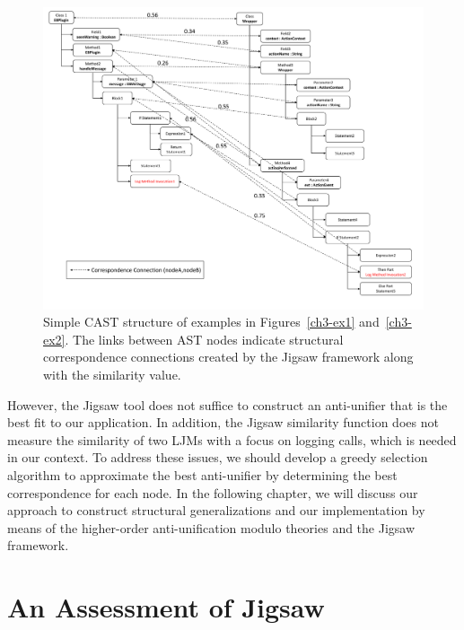 \begin{figure} [H]
  \centering\includegraphics [width = \textwidth]{Drawing4/FirstCorr.pdf}
  \caption{Simple CAST structure of examples in Figures~\ref{ch3-ex1} and~\ref{ch3-ex2}. The links between AST nodes indicate structural correspondence connections created by the Jigsaw framework along with the similarity value.}
  \label{fig:meth-ast-1}
\end{figure}

However, the Jigsaw tool does not suffice to construct an anti-unifier that is the best fit to our application. In addition, the Jigsaw similarity function does not measure the similarity of two LJMs with a focus on logging calls, which is needed in our context. To address these issues, we should develop a greedy selection algorithm to approximate the best anti-unifier by determining the best correspondence for each node. In the following chapter, we will discuss our approach to construct structural generalizations and our implementation by means of the higher-order anti-unification modulo theories and the Jigsaw framework.


\section{An Assessment of Jigsaw}\label{jigsaw-assessment}


